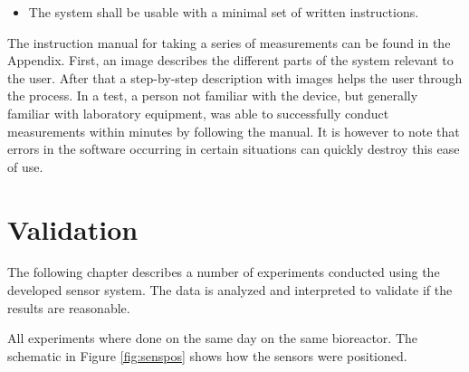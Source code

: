 \begin{itemize}
\item  The system shall be usable with a minimal set of written instructions.\\
\end{itemize}

The instruction manual for taking a series of measurements can be found in the Appendix. First, an image describes the different parts of the system relevant to the user. After that a step-by-step description with images helps the user through the process. In a test, a person not familiar with the device, but generally familiar with laboratory equipment, was able to successfully conduct measurements within minutes by following the manual. It is however to note that errors in the software occurring in certain situations can quickly destroy this ease of use.

\section{Validation} \label{val}

The following chapter describes a number of experiments conducted using the developed sensor system. The data is analyzed and interpreted to validate if the results are reasonable. 

All experiments where done on the same day on the same bioreactor. The schematic in Figure \ref{fig:senspos} shows how the sensors were positioned.

